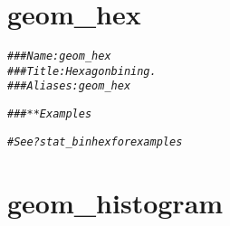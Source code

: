 \documentclass[a4paper,titlepage]{tufte-handout}\usepackage[]{graphicx}\usepackage[]{color}
\makeatletter
\newcommand{\hlcom}[1]{\textcolor[rgb]{0.678,0.584,0.686}{\textit{#1}}}%
\newenvironment{kframe}{%
 \def\at@end@of@kframe{}%
 \ifinner\ifhmode%
  \def\at@end@of@kframe{\end{minipage}}%
  \begin{minipage}{\columnwidth}%
 \fi\fi%
 \def\FrameCommand##1{\hskip\@totalleftmargin \hskip-\fboxsep
 \colorbox{shadecolor}{##1}\hskip-\fboxsep
     \hskip-\linewidth \hskip-\@totalleftmargin \hskip\columnwidth}%
 \MakeFramed {\advance\hsize-\width
   \@totalleftmargin\z@ \linewidth\hsize
   \@setminipage}}%
 {\par\unskip\endMakeFramed%
 \at@end@of@kframe}
\newenvironment{knitrout}{}{} %
\makeatother
\begin{document}
\section{geom\_hex}

\begin{knitrout}
\color{fgcolor}\begin{kframe}
\begin{alltt}
\hlcom{### Name: geom_hex}
\hlcom{### Title: Hexagon bining.}
\hlcom{### Aliases: geom_hex}

\hlcom{### ** Examples}

\hlcom{# See ?stat_binhex for examples}
\end{alltt}
\end{kframe}
\end{knitrout}


\section{geom\_histogram}
\end{document}
